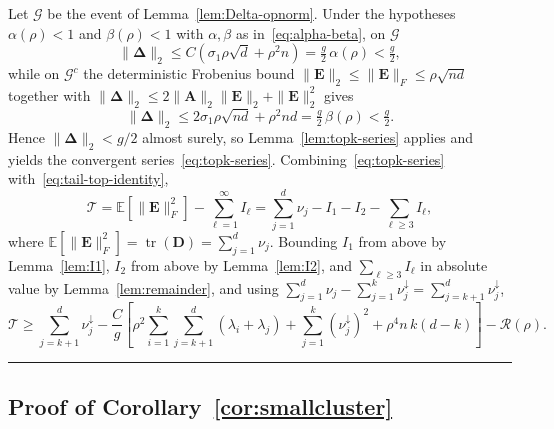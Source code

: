 \documentclass{article}
\newcommand{\twonorm}[1]{\|#1\|_2}
\newcommand{\Ex}[1]{\mbox{}\mathbb{E}\left[#1\right]}
\newcommand{\Ab}{\mathbf{A}}
\newcommand{\Db}{\mathbf{D}}
\newcommand{\Eb}{\mathbf{E}}
\newcommand{\Gcal}{\mathcal{G}}
\newcommand{\Rcal}{\mathcal{R}}
\newcommand{\Tcal}{\mathcal{T}}
\newcommand{\BlackBox}{\rule{1.5ex}{1.5ex}}  %
\newenvironment{proof}{\par\noindent{\bf Proof\ }}{\hfill\BlackBox\par\medskip}
\newcommand{\tr}{\mathop{\mathrm{tr}}}
\newcommand{\rbr}[1]{\left(#1\right)}
\newcommand{\sbr}[1]{\left[#1\right]}
\newcommand{\Deltab}{\boldsymbol{\Delta}}
\begin{document}
\begin{proof}
Let $\Gcal$ be the event of Lemma~\ref{lem:Delta-opnorm}. Under the hypotheses $\alpha(\rho)<1$ and $\beta(\rho)<1$ with $\alpha,\beta$ as in~\eqref{eq:alpha-beta}, on $\Gcal$
\begin{equation*}
    \twonorm{\Deltab}\le C\rbr{\sigma_1\rho\sqrt d+\rho^2 n} = \tfrac{g}{2}\,\alpha(\rho) < \tfrac{g}{2},
\end{equation*}
while on $\Gcal^c$ the deterministic Frobenius bound $\twonorm{\Eb}\le\|\Eb\|_F\le\rho\sqrt{nd}$ together with $\twonorm{\Deltab}\le 2\twonorm{\Ab}\twonorm{\Eb}+\twonorm{\Eb}^2$ gives
\begin{equation*}
    \twonorm{\Deltab}\le 2\sigma_1\rho\sqrt{nd}+\rho^2 nd = \tfrac{g}{2}\,\beta(\rho) < \tfrac{g}{2}.
\end{equation*}
Hence $\twonorm{\Deltab}<g/2$ almost surely, so Lemma~\ref{lem:topk-series} applies and yields the convergent series~\eqref{eq:topk-series}. Combining~\eqref{eq:topk-series} with~\eqref{eq:tail-top-identity},
\begin{equation*}
    \Tcal = \Ex{\|\Eb\|_F^2} - \sum_{\ell=1}^{\infty} I_\ell = \sum_{j=1}^{d}\nu_j - I_1 - I_2 - \sum_{\ell\ge 3} I_\ell,
\end{equation*}
where $\Ex{\|\Eb\|_F^2} = \tr(\Db) = \sum_{j=1}^{d}\nu_j$. Bounding $I_1$ from above by Lemma~\ref{lem:I1}, $I_2$ from above by Lemma~\ref{lem:I2}, and $\sum_{\ell\ge 3} I_\ell$ in absolute value by Lemma~\ref{lem:remainder}, and using $\sum_{j=1}^{d}\nu_j - \sum_{j=1}^{k}\nu_j^\downarrow = \sum_{j=k+1}^{d}\nu_j^\downarrow$,
\begin{equation*}
    \Tcal \ge \sum_{j=k+1}^{d}\nu_j^\downarrow - \frac{C}{g}\sbr{\rho^2\sum_{i=1}^{k}\sum_{j=k+1}^{d}(\lambda_i+\lambda_j) + \sum_{j=1}^{k}(\nu_j^\downarrow)^2 + \rho^4 n\,k(d-k)} - \Rcal(\rho).
\end{equation*}
\end{proof}

\subsection{Proof of Corollary~\ref{cor:smallcluster}}\label{app:smallcluster-cor}
\end{document}
